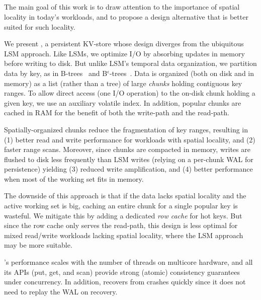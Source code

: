 \subsection{\sys} 
The main goal of this work is to draw attention to the importance of spatial locality in 
today's workloads, and to propose a design alternative  that is better suited for such locality. 

We present \sys, a persistent KV-store whose design diverges from the ubiquitous LSM approach.  
Like  LSMs,  we optimize I/O by absorbing updates in memory before writing to disk. 
But unlike LSM's temporal data organization, we partition data by key, as in B-trees~\cite{Comer79} and B$^\epsilon$-trees~\cite{Bender15}. 
Data is  organized (both on disk and in memory) as a list (rather than a tree) 
of large \emph{chunks} holding contiguous key ranges.
To allow direct access (one I/O operation) to the on-disk chunk holding a given key, we use an auxiliary volatile index.  
In addition, popular chunks are cached in RAM for the benefit of  both the write-path and the read-path.

Spatially-organized chunks reduce the fragmentation of key ranges, resulting in 
(1) better read and write performance for workloads with spatial locality,  and
(2) faster range scans. 
Moreover, since chunks  are compacted in memory, writes are 
flushed to disk less frequently than LSM writes (relying on a per-chunk WAL for persistence)
yielding 
(3) reduced write amplification, and 
(4) better performance when most of the working set fits in memory.

The downside of this approach is that if the data lacks spatial locality and the active working set is big, 
caching an entire chunk for a single popular key is wasteful. We mitigate this  by adding 
a dedicated \emph{row cache} for hot keys. But since the row cache only serves the read-path, 
this design is less optimal for mixed read/write workloads lacking spatial locality,
where the LSM approach may be more suitable.  

\sys's performance scales with the number of threads on multicore hardware, 
and all its APIs (put, get, and scan) provide strong (atomic) consistency guarantees 
under concurrency. 
In addition, \sys\/ recovers from crashes quickly since it does not need to replay the WAL on recovery.


